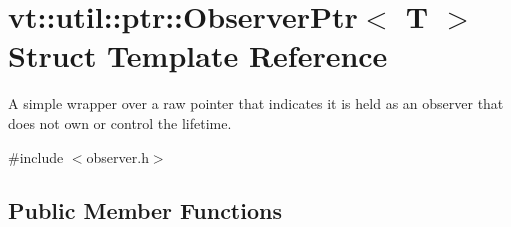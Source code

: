 \hypertarget{structvt_1_1util_1_1ptr_1_1_observer_ptr}{}\section{vt\+:\+:util\+:\+:ptr\+:\+:Observer\+Ptr$<$ T $>$ Struct Template Reference}
\label{structvt_1_1util_1_1ptr_1_1_observer_ptr}


A simple wrapper over a raw pointer that indicates it is held as an observer that does not own or control the lifetime.  




{\ttfamily \#include $<$observer.\+h$>$}

\subsection*{Public Member Functions}
